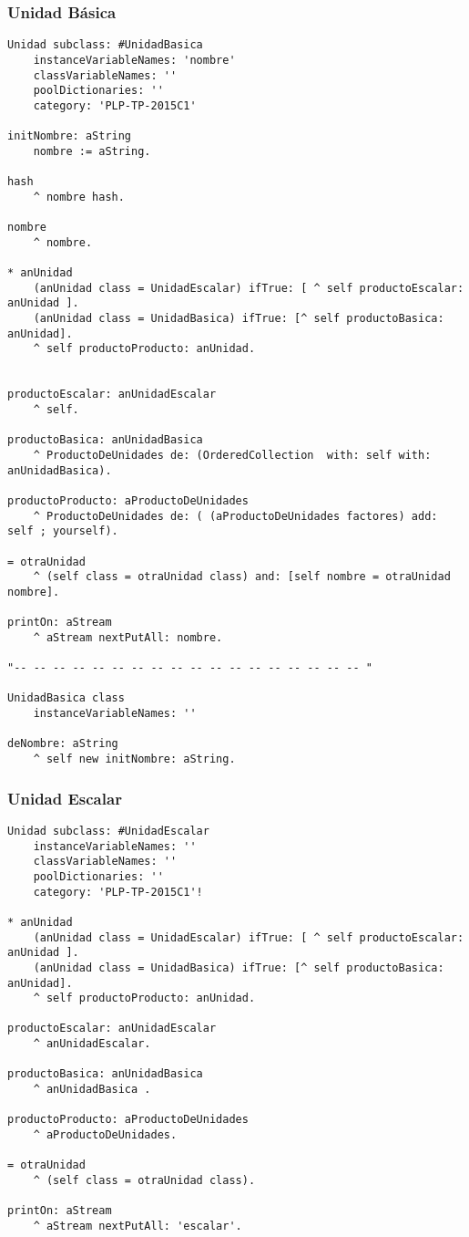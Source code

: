 \subsubsection{Unidad B\'asica}
\begin{lstlisting}
Unidad subclass: #UnidadBasica
	instanceVariableNames: 'nombre'
	classVariableNames: ''
	poolDictionaries: ''
	category: 'PLP-TP-2015C1'

initNombre: aString 
	nombre := aString.

hash
	^ nombre hash.

nombre
	^ nombre.
	
* anUnidad
	(anUnidad class = UnidadEscalar) ifTrue: [ ^ self productoEscalar: anUnidad ].
	(anUnidad class = UnidadBasica) ifTrue: [^ self productoBasica: anUnidad].
	^ self productoProducto: anUnidad.


productoEscalar: anUnidadEscalar 
	^ self.

productoBasica: anUnidadBasica
	^ ProductoDeUnidades de: (OrderedCollection  with: self with: anUnidadBasica).

productoProducto: aProductoDeUnidades 
	^ ProductoDeUnidades de: ( (aProductoDeUnidades factores) add: self ; yourself).

= otraUnidad
	^ (self class = otraUnidad class) and: [self nombre = otraUnidad nombre].

printOn: aStream 
	^ aStream nextPutAll: nombre.

"-- -- -- -- -- -- -- -- -- -- -- -- -- -- -- -- -- -- "

UnidadBasica class
	instanceVariableNames: ''

deNombre: aString 
	^ self new initNombre: aString.

\end{lstlisting}
\vspace{5mm}

\subsubsection{Unidad Escalar}
\begin{lstlisting}
Unidad subclass: #UnidadEscalar
	instanceVariableNames: ''
	classVariableNames: ''
	poolDictionaries: ''
	category: 'PLP-TP-2015C1'!

* anUnidad
	(anUnidad class = UnidadEscalar) ifTrue: [ ^ self productoEscalar: anUnidad ].
	(anUnidad class = UnidadBasica) ifTrue: [^ self productoBasica: anUnidad].
	^ self productoProducto: anUnidad.

productoEscalar: anUnidadEscalar 
	^ anUnidadEscalar.

productoBasica: anUnidadBasica 
	^ anUnidadBasica .

productoProducto: aProductoDeUnidades 
	^ aProductoDeUnidades.

= otraUnidad
	^ (self class = otraUnidad class).

printOn: aStream 
	^ aStream nextPutAll: 'escalar'.

\end{lstlisting}
\vspace{5mm}

